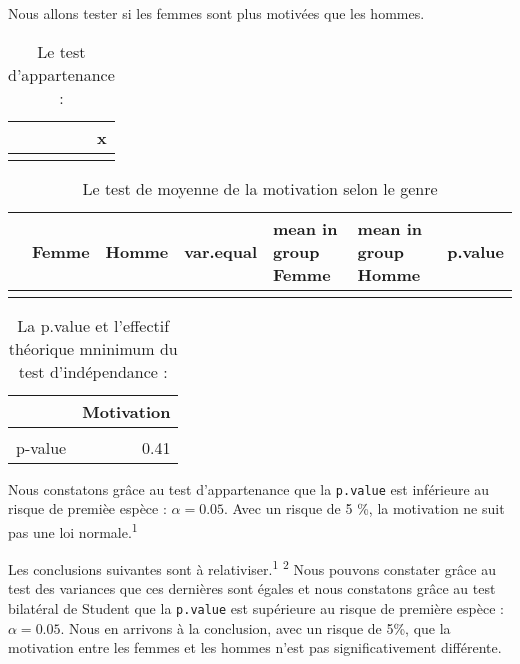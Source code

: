 \documentclass[
  11pt,
  french,
]{article}
\begin{document}
Nous allons tester si les femmes sont plus motivées que les hommes.

\begin{table}[!h]

\caption{\label{tab:tests1_non}Le test d'appartenance :}
\centering
\begin{tabular}[t]{lr}
\toprule
  & x\\
\midrule
\cellcolor{gray!6}{Motivation.p.value} & \cellcolor{gray!6}{0}\\
\bottomrule
\end{tabular}
\end{table}

\begin{table}[!h]

\caption{\label{tab:tests1_non}Le test de moyenne de la motivation selon le genre}
\centering
\begin{tabular}[t]{lllllll}
\toprule
  & Femme & Homme & var.equal & mean in group Femme & mean in group Homme & p.value\\
\midrule
\cellcolor{gray!6}{Motivation} & \cellcolor{gray!6}{65} & \cellcolor{gray!6}{81} & \cellcolor{gray!6}{Oui} & \cellcolor{gray!6}{7.45} & \cellcolor{gray!6}{7.06} & \cellcolor{gray!6}{0.24}\\
\bottomrule
\end{tabular}
\end{table}

\begin{table}[!h]

\caption{\label{tab:tests1_non}La p.value et l'effectif théorique mninimum du test d'indépendance :}
\centering
\begin{tabular}[t]{lr}
\toprule
  & Motivation\\
\midrule
\cellcolor{gray!6}{Eff\_théorique\_min} & \cellcolor{gray!6}{1.34}\\
p-value & 0.41\\
\bottomrule
\end{tabular}
\end{table}

Nous constatons grâce au test d'appartenance que la \texttt{p.value} est
inférieure au risque de premièe espèce : \(\alpha = 0.05\). Avec un
risque de 5 \%, la motivation ne suit pas une loi
normale.\textsuperscript{1}

Les conclusions suivantes sont à relativiser.\textsuperscript{1}
\textsuperscript{2} Nous pouvons constater grâce au test des variances
que ces dernières sont égales et nous constatons grâce au test bilatéral
de Student que la \texttt{p.value} est supérieure au risque de première
espèce : \(\alpha = 0.05\). Nous en arrivons à la conclusion, avec un
risque de 5\%, que la motivation entre les femmes et les hommes n'est
pas significativement différente.
\end{document}
